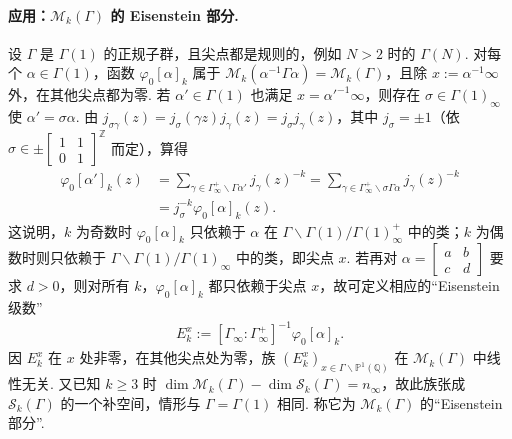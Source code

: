 \paragraph{应用：$\mathcal M_k(\Gamma)$ 的 Eisenstein 部分.}
设 $\Gamma$ 是 $\Gamma(1)$ 的正规子群，且尖点都是规则的，例如 $N>2$ 时的 $\Gamma(N)$. 对每个 $\alpha\in\Gamma(1)$，函数 $\varphi_0[\alpha]_k$ 属于 $\mathcal M_k(\alpha^{-1}\Gamma\alpha)=\mathcal M_k(\Gamma)$，且除 $x:=\alpha^{-1}\infty$ 外，在其他尖点都为零. 若 $\alpha'\in\Gamma(1)$ 也满足 $x=\alpha'^{-1}\infty$，则存在 $\sigma\in\Gamma(1)_\infty$ 使 $\alpha'=\sigma\alpha$. 由 $j_{\sigma\gamma}(z)=j_\sigma(\gamma z)j_\gamma(z)=j_\sigma j_\gamma(z)$，其中 $j_\sigma=\pm1$（依 $\sigma\in\pm\left[\begin{smallmatrix}1&1\\0&1\end{smallmatrix}\right]^{\mathbb Z}$ 而定），算得
\begin{align*}
\varphi_0[\alpha']_k(z)&=\sum_{\gamma\in\Gamma_\infty^+\backslash\Gamma\alpha'}j_\gamma(z)^{-k}=\sum_{\gamma\in\Gamma_\infty^+\backslash\sigma\Gamma\alpha}j_\gamma(z)^{-k}\\
&=j_\sigma^{-k}\varphi_0[\alpha]_k(z).
\end{align*}
这说明，$k$ 为奇数时 $\varphi_0[\alpha]_k$ 只依赖于 $\alpha$ 在 $\Gamma\backslash\Gamma(1)/\Gamma(1)_\infty^+$ 中的类；$k$ 为偶数时则只依赖于 $\Gamma\backslash\Gamma(1)/\Gamma(1)_\infty$ 中的类，即尖点 $x$. 若再对 $\alpha=\left[\begin{smallmatrix}a&b\\c&d\end{smallmatrix}\right]$ 要求 $d>0$，则对所有 $k$，$\varphi_0[\alpha]_k$ 都只依赖于尖点 $x$，故可定义相应的``Eisenstein 级数''
\begin{align*}
E_k^x:=[\Gamma_\infty:\Gamma_\infty^+]^{-1}\varphi_0[\alpha]_k.
\end{align*}
因 $E_k^x$ 在 $x$ 处非零，在其他尖点处为零，族 $(E_k^x)_{x\in\Gamma\backslash\mathbb P^1(\mathbb Q)}$ 在 $\mathcal M_k(\Gamma)$ 中线性无关. 又已知 $k\geqslant3$ 时 $\dim\mathcal M_k(\Gamma)-\dim\mathcal S_k(\Gamma)=n_\infty$，故此族张成 $\mathcal S_k(\Gamma)$ 的一个补空间，情形与 $\Gamma=\Gamma(1)$ 相同. 称它为 $\mathcal M_k(\Gamma)$ 的``Eisenstein 部分''.
